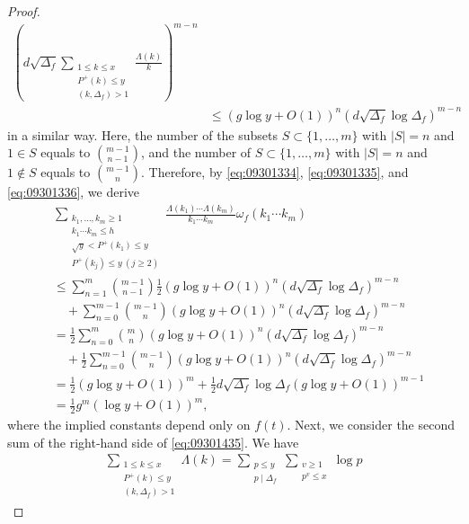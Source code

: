 \documentclass[a4paper,11pt]{amsart}
\theoremstyle{definition}
\numberwithin{equation}{section}
\begin{document}
\begin{proof}
\begin{align}
\left(d \sqrt{\Delta_f} \sum_{\substack{1 \leq k \leq x \\ P^+(k) \leq y \\ (k,\Delta_f)>1}} \frac{\Lambda(k)}{k} \right)^{m-n} \nonumber\\
&\leq \left(g \log{y}+O(1)\right)^n \left(d \sqrt{\Delta_f} \log{\Delta_f}\right)^{m-n} \nonumber
\end{align}
in a similar way. 
Here, the number of the subsets $S \subset \{1,\ldots,m\}$ with $|S|=n$ and $1 \in S$ equals to $\binom{m-1}{n-1}$, and the number of $S \subset \{1,\ldots,m\}$ with $|S|=n$ and $1 \notin S$ equals to $\binom{m-1}{n}$. 
Therefore, by \eqref{eq:09301334}, \eqref{eq:09301335}, and \eqref{eq:09301336}, we derive 
\begin{align}\label{eq:09301526}
&\sum_{\substack{k_1,\ldots,k_m \geq 1 \\ k_1 \cdots k_m \leq h \\ \sqrt{y} < P^+(k_1) \leq y  \\ P^+(k_j) \leq y ~(j \geq 2)}} 
\frac{\Lambda(k_1) \cdots \Lambda(k_m)}{k_1 \cdots k_m} \omega_f(k_1 \cdots k_m) \\
&\leq \sum_{n=1}^{m} \binom{m-1}{n-1} \frac{1}{2} \left(g \log{y}+O(1)\right)^{n} \left(d \sqrt{\Delta_f} \log{\Delta_f}\right)^{m-n} \nonumber \\
&\quad
+ \sum_{n=0}^{m-1} \binom{m-1}{n} \left(g \log{y}+O(1)\right)^{n} \left(d \sqrt{\Delta_f} \log{\Delta_f}\right)^{m-n} \nonumber \\
&= \frac{1}{2}  \sum_{n=0}^{m} \binom{m}{n} \left(g \log{y}+O(1)\right)^{n} \left(d \sqrt{\Delta_f} \log{\Delta_f}\right)^{m-n} \nonumber \\
&\quad
+ \frac{1}{2} \sum_{n=0}^{m-1} \binom{m-1}{n} \left(g \log{y}+O(1)\right)^{n} \left(d \sqrt{\Delta_f} \log{\Delta_f}\right)^{m-n} \nonumber \\
&= \frac{1}{2} (g \log{y}+O(1))^m 
+ \frac{1}{2} d \sqrt{\Delta_f} \log{\Delta_f} (g \log{y}+O(1))^{m-1} \nonumber \\
&= \frac{1}{2} g^m(\log{y}+O(1))^m , \nonumber
\end{align}
where the implied constants depend only on $f(t)$.
Next, we consider the second sum of the right-hand side of \eqref{eq:09301435}. 
We have
\begin{align*}
\sum_{\substack{1 \leq k \leq x \\ P^+(k) \leq y \\ (k,\Delta_f)>1}} \Lambda(k)
= \sum_{\substack{p \leq y \\ p \mid \Delta_f}} \sum_{\substack{v \geq1 \\ p^v \leq x}} \log{p}

\end{align*}
\end{proof}
\end{document}
